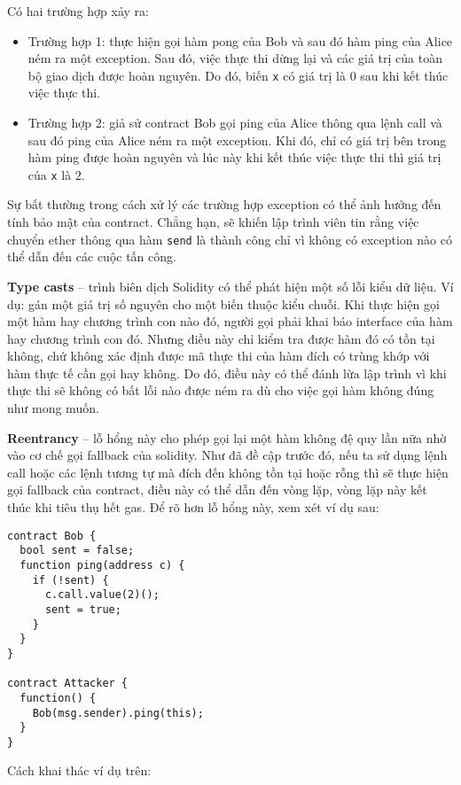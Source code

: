 \documentclass[../main-report.tex]{subfiles}
\begin{document}
Có hai trường hợp xảy ra:

\begin{itemize}
\item Trường hợp 1: thực hiện gọi hàm pong của Bob và sau đó hàm ping của Alice ném ra một exception. Sau đó, việc thực thi dừng lại và các giá trị của toàn bộ giao dịch được hoàn nguyên. Do đó, biến \texttt{x} có giá trị là $0$ sau khi kết thúc việc thực thi.
\item Trường hợp 2: giả sử contract Bob gọi ping của Alice thông qua lệnh call và sau đó ping của Alice ném ra một exception. Khi đó, chỉ có giá trị bên trong hàm ping được hoàn nguyên và lúc này khi kết thúc việc thực thi thì giá trị của \texttt{x} là $2$.
\end{itemize}

Sự bất thường trong cách xử lý các trường hợp exception có thể ảnh hưởng đến tính bảo mật của contract. Chẳng hạn, sẽ khiến lập trình viên tin rằng việc chuyển ether thông qua hàm \texttt{send} là thành công chỉ vì không có exception nào có thể dẫn đến các cuộc tấn công.

\textbf{Type casts} -- trình biên dịch Solidity có thể phát hiện một số lỗi kiểu dữ liệu. Ví dụ: gán một giá trị số nguyên cho một biến thuộc kiểu chuỗi. Khi thực hiện gọi một hàm hay chương trình con nào đó, người gọi phải khai báo interface của hàm hay chương trình con đó. Nhưng điều này chỉ kiểm tra được hàm đó có tồn tại không, chứ không xác định được mã thực thi của hàm đích có trùng khớp với hàm thực tế cần gọi hay không. Do đó, điều này có thể đánh lừa lập trình vì khi thực thi sẽ không có bất lỗi nào được ném ra dù cho việc gọi hàm không đúng như mong muốn.

\textbf{Reentrancy} -- lỗ hổng này cho phép gọi lại một hàm không đệ quy lần nữa nhờ vào cơ chế gọi fallback của solidity. Như đã đề cập trước đó, nếu ta sử dụng lệnh call hoặc các lệnh tương tự mà đích đến không tồn tại hoặc rỗng thì sẽ thực hiện gọi fallback của contract, điều này có thể dẫn đến vòng lặp, vòng lặp này kết thúc khi tiêu thụ hết gas. Để rõ hơn lỗ hổng này, xem xét ví dụ sau:

\begin{lstlisting}
contract Bob {
  bool sent = false;
  function ping(address c) {
    if (!sent) {
      c.call.value(2)();
      sent = true;
    }
  }
}

contract Attacker {
  function() {
    Bob(msg.sender).ping(this);
  }
}
\end{lstlisting}

Cách khai thác ví dụ trên:
\end{document}
